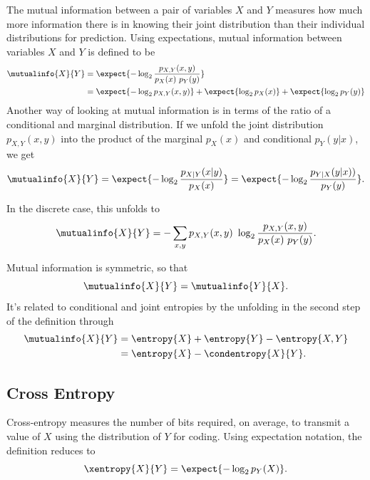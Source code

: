 The mutual information between a pair of variables $X$ and $Y$ measures how
much more information there is in knowing their joint distribution than their
individual distributions for prediction.  Using expectations, mutual information
between variables $X$ and $Y$ is defined to be
%
\begin{align}
\mutualinfo{X}{Y} 
&= \expect{-\log_2 \frac{p_{X,Y}(x,y)}{p_X(x) \ p_Y(y)}}
\\
&= \expect{-\log_2 p_{X,Y}(x,y)} + \expect{\log_2 p_X(x)} + \expect{\log_2 p_Y(y)}
\end{align}
%
Another way of looking at mutual information is in terms of
the ratio of a conditional and marginal distribution.  If
we unfold the joint distribution $p_{X,Y}(x,y)$ into the product
of the marginal $p_X(x)$ and conditional $p_Y(y|x)$, we get
%
\begin{equation}
\mutualinfo{X}{Y} 
= \expect{-\log_2 \frac{p_{X|Y}(x|y)}{p_X(x)}}
= \expect{-\log_2 \frac{p_{Y|X}(y|x))}{p_Y(y)}}.
\end{equation}



In the discrete case, this unfolds to
%
\begin{equation}
\mutualinfo{X}{Y} = - \sum_{x,y} p_{X,Y}(x,y) \ \log_2 \frac{p_{X,Y}(x,y)}{p_X(x) \ p_Y(y)}.
\end{equation}
%


Mutual information is symmetric, so that
%
\begin{equation}
\mutualinfo{X}{Y} = \mutualinfo{Y}{X}.
\end{equation}
%
It's related to conditional and joint entropies by the unfolding
in the second step of the definition through
%
\begin{align}
\mutualinfo{X}{Y} &= \entropy{X} + \entropy{Y} - \entropy{X,Y}
\\
&= \entropy{X} - \condentropy{X}{Y}.
\end{align}
%

\subsection{Cross Entropy}\label{section:stats-cross-entropy}

Cross-entropy measures the number of bits required, on average, to
transmit a value of $X$ using the distribution of $Y$ for coding.
Using expectation notation, the definition reduces to
%
\begin{equation}
\xentropy{X}{Y} = \expect{-\log_2 p_Y(X)}.
\end{equation}

